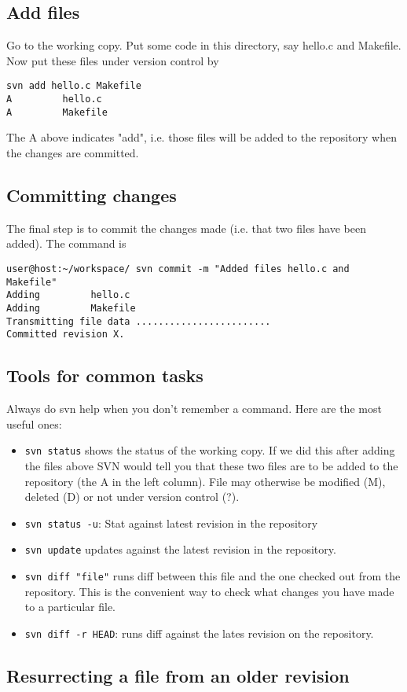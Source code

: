 \documentclass{article}
\begin{document}
\subsection{Add files}
Go to the working copy. Put some code in this directory, say hello.c
and Makefile. Now put these files under version control by  
\begin{verbatim}
svn add hello.c Makefile
A         hello.c
A         Makefile
\end{verbatim}
The A above indicates "add", i.e. those files will be added to the
repository when the changes are committed.  
\subsection{Committing changes}
The final step is to commit the changes made (i.e. that two files have
been added). The command is  
\begin{verbatim}
user@host:~/workspace/ svn commit -m "Added files hello.c and Makefile"
Adding         hello.c
Adding         Makefile
Transmitting file data ........................
Committed revision X.
\end{verbatim}
\subsection{Tools for common tasks}
Always do svn help when you don't remember a command. Here are the
most useful ones: 
\begin{itemize}
\item \verb+svn status+ shows the status of the working copy. If we did this
  after adding the files above SVN would tell you that these
  two files are to be added to the repository (the A in the
  left column). File may otherwise be modified (M), deleted
  (D) or not under version control (?). 
\item \verb+svn status -u+: Stat against latest revision in the repository 
\item \verb+svn update+ updates against the latest revision in the repository.
\item \verb+svn diff "file"+ runs diff between this file and the one checked out from the repository. This is the convenient way to check what changes you have made to a particular file.
  \item \verb+svn diff -r HEAD+: runs diff against the lates revision on the repository. 
\end{itemize}
\subsection{Resurrecting a file from an older revision}
\end{document}
